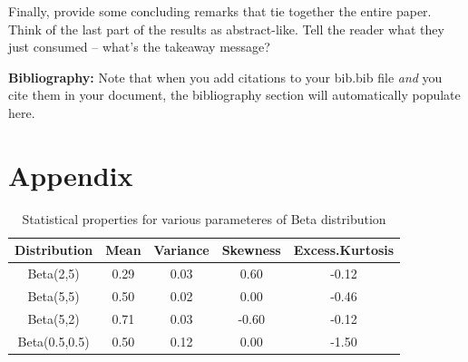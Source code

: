 \documentclass{article}\usepackage[]{graphicx}\usepackage[]{xcolor}
\begin{document}
\begin{multicols}{2}
Finally, provide some concluding remarks that tie together the entire paper. Think of the last part of the results as abstract-like. Tell the reader what they just consumed -- what's the takeaway message?

\vspace{2em}

\noindent\textbf{Bibliography:} Note that when you add citations to your bib.bib file \emph{and}
you cite them in your document, the bibliography section will automatically populate here.

\begin{tiny}

\end{tiny}
\end{multicols}

\newpage
\onecolumn
\section{Appendix}

\begin{table}[ht]
\centering
\begin{tabular}{|c|c|c|c|c|}
  \hline
Distribution & Mean & Variance & Skewness & Excess.Kurtosis \\ 
  \hline
Beta(2,5) & 0.29 & 0.03 & 0.60 & -0.12 \\ 
  Beta(5,5) & 0.50 & 0.02 & 0.00 & -0.46 \\ 
  Beta(5,2) & 0.71 & 0.03 & -0.60 & -0.12 \\ 
  Beta(0.5,0.5) & 0.50 & 0.12 & 0.00 & -1.50 \\ 
   \hline
\end{tabular}
\caption{Statistical properties for various parameteres of Beta distribution} 
\label{statsProperties.tab}
\end{table}
\end{document}
